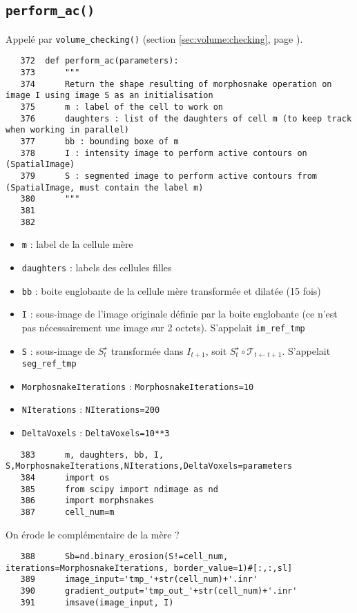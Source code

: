\documentclass{article}
\def \mycolor {red}
\begin{document}
\subsection{\texttt{perform\_ac()}}
\label{sec:perform:ac}
Appel\'e par \texttt{volume\_checking()}
(section \ref{sec:volume:checking}, page \pageref{sec:volume:checking}).

\begin{verbatim}
   372	def perform_ac(parameters):
   373	    """
   374	    Return the shape resulting of morphosnake operation on image I using image S as an initialisation
   375	    m : label of the cell to work on
   376	    daughters : list of the daughters of cell m (to keep track when working in parallel)
   377	    bb : bounding boxe of m
   378	    I : intensity image to perform active contours on (SpatialImage)
   379	    S : segmented image to perform active contours from (SpatialImage, must contain the label m)
   380	    """
   381	
   382	
\end{verbatim} 
\color{\mycolor}
\begin{itemize}
\itemsep -1ex
\item \verb|m| : label de la cellule m\`ere 
\item \verb|daughters| : labels des cellules filles
\item \verb|bb| : boite englobante de la cellule m\`ere transform\'ee et dilat\'ee (15 fois)
\item \verb|I| : sous-image de l'image originale d\'efinie par la boite englobante (ce n'est pas n\'ecessairement une image sur 2 octets). S'appelait  \verb|im_ref_tmp|
\item \verb|S| : sous-image de $S^{\star}_t$ transform\'ee dans $I_{t+1}$, soit $S^{\star}_t \circ \mathcal{T}_{t \leftarrow t+1}$. S'appelait  \verb|seg_ref_tmp|
\item \verb|MorphosnakeIterations| : \verb|MorphosnakeIterations=10|
\item \verb|NIterations| : \verb|NIterations=200|
\item \verb|DeltaVoxels| : \verb|DeltaVoxels=10**3|
\end{itemize}
\color{black}
\begin{verbatim}
   383	    m, daughters, bb, I, S,MorphosnakeIterations,NIterations,DeltaVoxels=parameters
   384	    import os
   385	    from scipy import ndimage as nd
   386	    import morphsnakes
   387	    cell_num=m
\end{verbatim} 
\color{\mycolor}
On \'erode le compl\'ementaire de la m\`ere ?
\color{black}
\begin{verbatim} 
   388	    Sb=nd.binary_erosion(S!=cell_num, iterations=MorphosnakeIterations, border_value=1)#[:,:,sl]
   389	    image_input='tmp_'+str(cell_num)+'.inr'
   390	    gradient_output='tmp_out_'+str(cell_num)+'.inr'
   391	    imsave(image_input, I)
\end{verbatim} 
\end{document}
